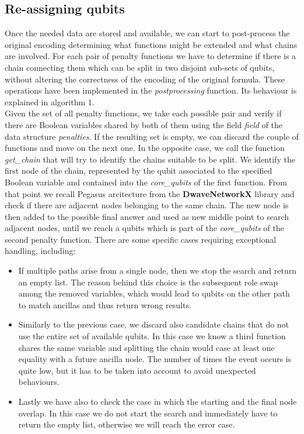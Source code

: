 \subsection{Re-assigning qubits}

Once the needed data are stored and available, we can start to post-process the original encoding determining what functions might be extended and what chains are involved. For each pair of penalty functions we have to determine if there is a chain connecting them which can be split in two disjoint sub-sets of qubits, without altering the correctness of the encoding of the original formula. 
These operations have been implemented in the \textit{postprocessing} function. Its behaviour is explained in algorithm 1.\\
Given the set of all penalty functions, we take each possible pair and verify if there are Boolean variables shared by both of them using the field \textit{field} of the data structure \textit{penalties}. If the resulting set is empty, we can discard the couple of functions and move on the next one. In the opposite case, we call the function \textit{get\_chain} that will try to identify the chains suitable to be split. We identify the first node of the chain, represented by the qubit associated to the specified Boolean variable and contained into the \textit{core\_qubits} of the first function. From that point we recall Pegasus arcitecture from the \textbf{DwaveNetworkX} library and check if there are adjacent nodes belonging to the same chain. The new node is then added to the possible final answer and used as new middle point to search adjacent nodes, until we reach a qubits which is part of the \textit{core\_qubits} of the second penalty function. There are some specific cases requiring exceptional handling, including:

\begin{itemize}
    \item If multiple paths arise from a single node, then we stop the search and return an empty list. The reason behind this choice is the subsequent role swap among the removed variables, which would lead to qubits on the other path to match ancillas and thus return wrong results.
    \item Similarly to the previous case, we discard also candidate chains that do not use the entire set of available qubits. In this case we know a third function shares the same variable and splitting the chain would case at least one equality with a future ancilla node. The number of times the event occurs is quite low, but it has to be taken into account to avoid unexpected behaviours.
    \item Lastly we have also to check the case in which the starting and the final node overlap. In this case we do not start the search and immediately have to return the empty list, otherwise we will reach the error case.
\end{itemize}

